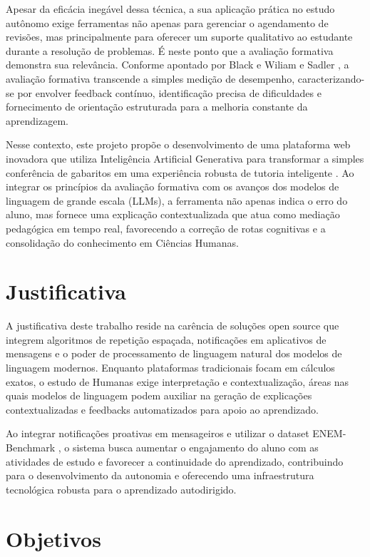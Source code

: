 \documentclass[
12pt,
openright,
oneside,
a4paper,
brazil
]{abntex2}
\begin{document}
Apesar da eficácia inegável dessa técnica, a sua aplicação prática no estudo autônomo exige ferramentas não apenas para gerenciar o agendamento de revisões, mas principalmente para oferecer um suporte qualitativo ao estudante durante a resolução de problemas. É neste ponto que a avaliação formativa demonstra sua relevância. Conforme apontado por Black e Wiliam \cite{blackwilliam} e Sadler \cite{sadler}, a avaliação formativa transcende a simples medição de desempenho, caracterizando-se por envolver feedback contínuo, identificação precisa de dificuldades e fornecimento de orientação estruturada para a melhoria constante da aprendizagem.

Nesse contexto, este projeto propõe o desenvolvimento de uma plataforma web inovadora que utiliza Inteligência Artificial Generativa para transformar a simples conferência de gabaritos em uma experiência robusta de tutoria inteligente \cite{kasneci2023chatgpt}. Ao integrar os princípios da avaliação formativa com os avanços dos modelos de linguagem de grande escala (LLMs), a ferramenta não apenas indica o erro do aluno, mas fornece uma explicação contextualizada que atua como mediação pedagógica em tempo real, favorecendo a correção de rotas cognitivas e a consolidação do conhecimento em Ciências Humanas.

\section{Justificativa}

A justificativa deste trabalho reside na carência de soluções open source que integrem algoritmos de repetição espaçada, notificações em aplicativos de mensagens e o poder de processamento de linguagem natural dos modelos de linguagem modernos. Enquanto plataformas tradicionais focam em cálculos exatos, o estudo de Humanas exige interpretação e contextualização, áreas nas quais modelos de linguagem podem auxiliar na geração de explicações contextualizadas e feedbacks automatizados para apoio ao aprendizado.

Ao integrar notificações proativas em mensageiros e utilizar o dataset ENEM-Benchmark \cite{maritaca}, o sistema busca aumentar o engajamento do aluno com as atividades de estudo e favorecer a continuidade do aprendizado, contribuindo para o desenvolvimento da autonomia e oferecendo uma infraestrutura tecnológica robusta para o aprendizado autodirigido.

\section{Objetivos}
\end{document}
